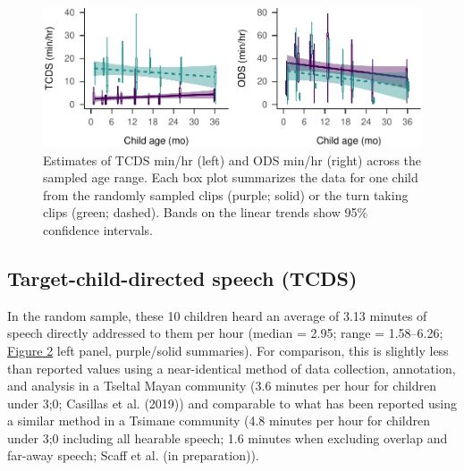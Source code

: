 \documentclass[,man,floatsintext]{apa6}
\begin{document}
\begin{figure}
\centering
\includegraphics{Yeli-CLE_files/figure-latex/fig2-1.pdf}
\caption{\label{fig:fig2}Estimates of TCDS min/hr (left) and ODS min/hr
(right) across the sampled age range. Each box plot summarizes the data
for one child from the randomly sampled clips (purple; solid) or the
turn taking clips (green; dashed). Bands on the linear trends show 95\%
confidence intervals.}
\end{figure}

\subsection{Target-child-directed speech
(TCDS)}\label{target-child-directed-speech-tcds}

In the random sample, these 10 children heard an average of 3.13 minutes
of speech directly addressed to them per hour (median = 2.95; range =
1.58--6.26; \protect\hyperlink{fig2}{Figure 2} left panel, purple/solid
summaries). For comparison, this is slightly less than reported values
using a near-identical method of data collection, annotation, and
analysis in a Tseltal Mayan community (3.6 minutes per hour for children
under 3;0; Casillas et al. (2019)) and comparable to what has been
reported using a similar method in a Tsimane community (4.8 minutes per
hour for children under 3;0 including all hearable speech; 1.6 minutes
when excluding overlap and far-away speech; Scaff et al. (in
preparation)).
\end{document}

